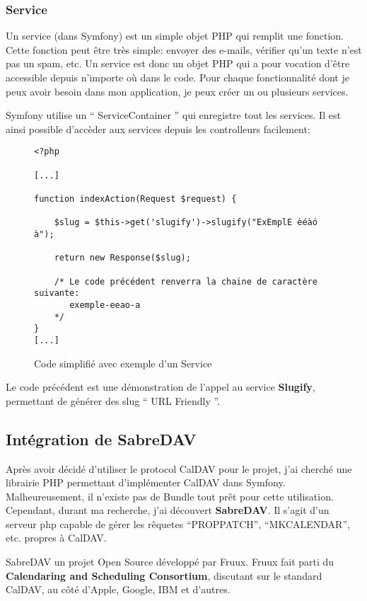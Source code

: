 \subsubsection*{Service}

Un service (dans Symfony) est un simple objet PHP qui remplit une fonction. Cette fonction peut être très simple: envoyer des e-mails, vérifier qu'un texte n'est pas un spam, etc. Un service est donc un objet PHP qui a pour vocation d'être accessible depuis n'importe où dans le code. Pour chaque fonctionnalité dont je peux avoir besoin dans mon application, je peux créer un ou plusieurs services.

Symfony utilise un `` ServiceContainer '' qui enregistre tout les services. Il est ainsi possible d'accèder aux services depuis les controlleurs facilement:

\begin{figure}[h]
\begin{lstlisting}[frame=single]
<?php

[...]

function indexAction(Request $request) {

    $slug = $this->get('slugify')->slugify("ExEmplE èéàó à");

    return new Response($slug);

    /* Le code précédent renverra la chaine de caractère suivante:
       exemple-eeao-a
    */
}
[...]

\end{lstlisting}
\caption{Code simplifié avec exemple d'un Service}
\end{figure}


\newpage

Le code précédent est une démonstration de l'appel au service \textbf{Slugify}, permettant de générer des slug `` URL Friendly ''.

\subsection{Intégration de SabreDAV}

Après avoir décidé d'utiliser le protocol CalDAV pour le projet, j'ai cherché une librairie PHP permettant d'implémenter CalDAV dans Symfony. Malheureusement, il n'existe pas de Bundle tout prêt pour cette utilisation. Cependant, durant ma recherche, j'ai découvert \textbf{SabreDAV}. Il s'agit d'un serveur php capable de gérer les rêquetes ``PROPPATCH'', ``MKCALENDAR'', etc. propres à CalDAV.

SabreDAV un projet Open Source développé par Fruux. Fruux fait parti du \textbf{Calendaring and Scheduling Consortium}, discutant sur le standard CalDAV, au côté d'Apple, Google, IBM et d'autres.

